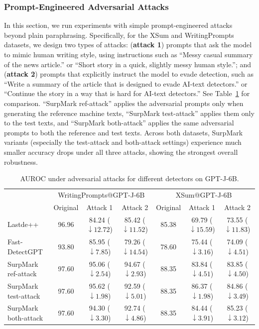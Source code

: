 \documentclass{article}
\theoremstyle{plain}
\theoremstyle{definition}
\theoremstyle{remark}
\begin{document}
\subsubsection{Prompt-Engineered Adversarial Attacks} \label{sec:prompts-eng-attack}In this section, we run experiments with simple prompt-engineered attacks beyond plain paraphrasing. Specifically, for the XSum and WritingPrompts datasets, we design two types of attacks: (\textbf{attack 1}) prompts that ask the model to mimic human writing style, using instructions such as “Messy casual summary of the news article.” or “Short story in a quick, slightly messy human style.”; and (\textbf{attack 2}) prompts that explicitly instruct the model to evade detection, such as “Write a summary of the article that is designed to evade AI-text detectors.” or “Continue the story in a way that is hard for AI-text detectors.” See Table~\ref{tab:attack-gptj} for comparison. “SurpMark ref-attack” applies the adversarial prompts only when generating the reference machine texts, “SurpMark test-attack” applies them only to the test texts, and “SurpMark both-attack” applies the same adversarial prompts to both the reference and test texts. Across both datasets, SurpMark variants (especially the test-attack and both-attack settings) experience much smaller accuracy drops under all three attacks, showing the strongest overall robustness.

\begin{table}[h]
\centering
{\scriptsize
\begin{tabular}{l c c c c c c}
\toprule
& \multicolumn{3}{c}{WritingPrompts@GPT-J-6B} 
& \multicolumn{3}{c}{XSum@GPT-J-6B} \\


& Original & Attack 1 & Attack 2 
& Original & Attack 1 & Attack 2 \\
\midrule
Lastde++             
& 96.96 
& 84.24 ($\downarrow 12.72$) 
& 85.42 ($\downarrow 11.52$)
& 85.38 
& 69.79 ($\downarrow 15.59$) 
& 73.55 ($\downarrow 11.83$) \\
Fast-DetectGPT       
& 93.80 
& 85.95 ($\downarrow 7.85$) 
& 79.26 ($\downarrow 14.54$)
& 78.60 
& 75.44 ($\downarrow 3.16$) 
& 74.09 ($\downarrow 4.51$) \\
SurpMark ref-attack  
& 97.60 
& 95.06 ($\downarrow 2.54$) 
& 94.67 ($\downarrow 2.93$)
& 88.35 
& 83.84 ($\downarrow 4.51$) 
& 83.85 ($\downarrow 4.50$) \\
SurpMark test-attack 
& 97.60 
& 95.62 ($\downarrow 1.98$) 
& 92.59 ($\downarrow 5.01$)
& 88.35 
& 86.37 ($\downarrow 1.98$) 
& 84.86 ($\downarrow 3.49$) \\
SurpMark both-attack 
& 97.60 
& 94.30 ($\downarrow 3.30$) 
& 92.74 ($\downarrow 4.86$)
& 88.35 
& 84.44 ($\downarrow 3.91$) 
& 85.23 ($\downarrow 3.12$) \\
\bottomrule
\end{tabular}}
\caption{AUROC under adversarial attacks for different detectors on GPT-J-6B.}
\label{tab:attack-gptj}
\end{table}
\end{document}
